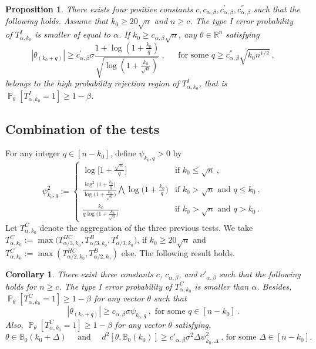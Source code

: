 \documentclass[twoside,11pt]{article}
\newtheorem{prp}{Proposition}
\newtheorem{cor}{Corollary}
\def\beq{\begin{equation}}
\def\eeq{\end{equation}}
\renewcommand{\P}{\operatorname{\mathbb{P}}}
\newcommand{\<}{\langle}
\renewcommand{\>}{\rangle}
\begin{document}
 \begin{prp}\label{cor:power_TI}
 There exists four positive constants $c,c_{\alpha,\beta},c^{'}_{\alpha,\beta}, c^{''}_{\alpha,\beta}$ such that the following holds. Assume that $k_0\geq 20\sqrt{n}$ and $n\geq c$.
  The type I error  probability of  $T^{I}_{\alpha,k_0}$  is smaller of equal to $\alpha$.  If $k_0\geq c_{\alpha,\beta}\sqrt{n}$,  any $\theta\in \mathbb{R}^n$ satisfying
 \[
 |\theta_{(k_0+q)}| \geq  c^{'}_{\alpha,\beta}\sigma \frac{1+ \log(1+\frac{k_0}{q})}{\sqrt{\log(1+\frac{k_0}{\sqrt{n}})}}\ ,\quad \ \text{ for some }q\geq c^{''}_{\alpha,\beta} \sqrt{k_0n^{1/2}}\ ,
 \]
belongs to the high probability rejection region of $T^{I}_{\alpha,k_0}$, that is $\P_{\theta}[T^{I}_{\alpha,k_0}=1]\geq 1-\beta$.
 \end{prp}

 

 
 
 \subsection{Combination of the tests}
 

 
 
For any integer $q\in [n-k_0]$, define $\psi_{k_0,q}>0$ by 
\beq \label{eq:upper_distance_linfty}
\psi^2_{k_0,q}:= \left\{\begin{array}{cc}
\log\Big[1+ \frac{\sqrt{n}}{q}\Big] & \text{if }k_0\leq \sqrt{n}\ ,\\
\frac{\log^2\big(1+  \tfrac{k_0}{q}\big)}{\log\big(1+\frac{ k_0}{\sqrt{n}}\big)} \bigwedge \log\big(1+ \frac{k_0}{q}\big) & \text{if }k_0 > \sqrt{n} \text{ and }q\leq k_0\ ,\\
\frac{k_0}{q\log\big(1+\frac{ k_0}{\sqrt{n}}\big)} & \text{if }k_0 > \sqrt{n} \text{ and }q> k_0\ .
                          \end{array}\right.
\eeq
Let $T^{C}_{\alpha,k_0}$ denote the aggregation of the three previous tests. We take $T^{C}_{\alpha,k_0}:=\max\big(T^{HC}_{\alpha/3,k_0},T^{B}_{\alpha/3,k_0},T^{I}_{\alpha/3,k_0}\Big)$,
if $k_0\geq 20\sqrt{n}$ and $T^{C}_{\alpha,k_0}:=\max(T^{HC}_{\alpha/2,k_0},T^{B}_{\alpha/2,k_0})$ else. The following result holds.
 


\begin{cor}\label{cor:power_combined2}There exist three constants $c$, $c_{\alpha,\beta}$, and $c'_{\alpha,\beta}$ such that the following holds for $n\geq c$. 
 The type I error  probability of $T^{C}_{\alpha,k_0}$ is smaller than $\alpha$. Besides, 
 $\P_{\theta}[T^{C}_{\alpha,k_0}=1]\geq 1-\beta$ for any vector $\theta$ such that 
 \beq\label{eq:upper_adaptatif_linfini}
 |\theta_{(k_0+q)}| \geq c_{\alpha,\beta}\sigma \psi_{k_0,q}\ , \text{ for some } q\in [n-k_0]\ .
 \eeq
  Also,  $\P_{\theta}[T^{C}_{\alpha,k_0}=1]\geq 1-\beta$ for any vector $\theta$ satisfying,
 \beq\label{eq:upper_adaptatif_l2}
  \theta\in \mathbb{B}_0(k_0+\Delta)\quad  \text{ and }\quad  d^2[\theta,\mathbb{B}_0(k_0)] \geq c'_{\alpha,\beta}\sigma^2 \Delta\psi^2_{k_0,\Delta}\ ,\, \text{for some $\Delta\in [n-k_0]$.}
 \eeq
\end{cor}
 
\end{document}
